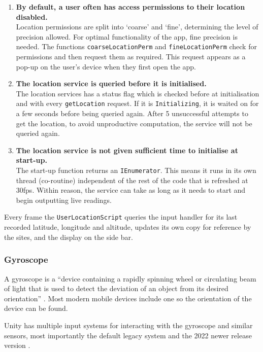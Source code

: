 \documentclass[12pt, a4paper]{article}
\begin{document}
\begin{enumerate}
    \item \textbf{By default, a user often has access permissions to their location disabled.} \\ Location permissions are split into `coarse' and `fine', determining the level of precision allowed. For optimal functionality of the app, fine precision is needed. The functions \verb|coarseLocationPerm| and \verb|fineLocationPerm| check for permissions and then request them as required. This request appears as a pop-up on the user's device when they first open the app.
    \item \textbf{The location service is queried before it is initialised.} \\ The location services has a status flag which is checked before at initialisation and with every \verb|getLocation| request. If it is \verb|Initializing|, it is waited on for a few seconds before being queried again. After 5 unsuccessful attempts to get the location, to avoid unproductive computation, the service will not be queried again.
    \item \textbf{The location service is not given sufficient time to initialise at start-up.} \\ The start-up function returns an \verb|IEnumerator|. This means it runs in its own thread (co-routine) independent of the rest of the code that is refreshed at 30fps. Within reason, the service can take as long as it needs to start and begin outputting live readings.
\end{enumerate}

Every frame the \verb|UserLocationScript| queries the input handler for its last recorded latitude, longitude and altitude, updates its own copy for reference by the sites, and the display on the side bar.

\subsubsection{Gyroscope}
A gyroscope is a ``device containing a rapidly spinning wheel or circulating beam of light that is used to detect the deviation of an object from its desired orientation'' \cite{movement:whatisgyro}. Most modern mobile devices include one so the orientation of the device can be found.

Unity has multiple input systems for interacting with the gyroscope and similar sensors, most importantly the default legacy system and the 2022 newer release version \cite{movement:newinputsystem}. 
\end{document}
